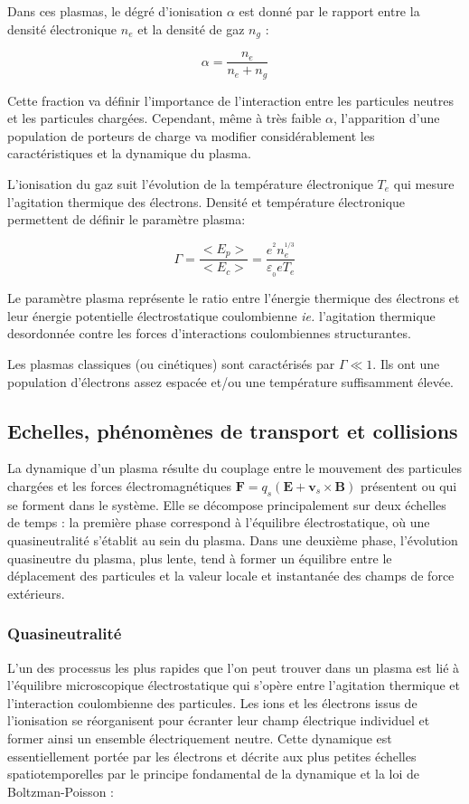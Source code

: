 Dans ces plasmas, le dégré d'ionisation $\alpha$ est donné par le rapport
entre la densité électronique $n_e$ et la densité de gaz $n_g$ :

\begin{equation}
\alpha=\frac{n_e}{n_e+n_g}
\end{equation}

Cette fraction va définir l'importance de l'interaction entre les particules
neutres et les particules chargées. Cependant, même à très faible $\alpha$,
l'apparition d'une population de porteurs de charge va modifier considérablement 
les caractéristiques et la dynamique du plasma.

L'ionisation du gaz suit l'évolution de la température électronique $T_e$ qui
mesure l'agitation thermique des électrons. Densité et température
électronique permettent de définir le paramètre plasma:

\begin{equation}
\label{1-paramPlasma}
\Gamma=\frac{<E_p>}{<E_c>}=\frac{e^{^2}n_e^{^{1/3}}}{\varepsilon_{_0}
eT_e}
\end{equation}

Le paramètre plasma représente le ratio entre l'énergie thermique des
électrons et leur énergie potentielle électrostatique coulombienne \emph{ie.}
l'agitation thermique desordonnée contre les forces d'interactions
coulombiennes structurantes.

Les plasmas classiques (ou cinétiques) sont caractérisés par
$\Gamma\ll 1$. Ils ont une population d'électrons assez espacée et/ou une
température suffisamment élevée.

\subsection{Echelles, phénomènes de transport et collisions}
La dynamique d'un plasma résulte du couplage entre le mouvement des
particules chargées et les forces électromagnétiques $\mathbf
F=q_s(\mathbf E+ \mathbf v_s\times\mathbf B)$
présentent ou qui se forment dans le système.
Elle se décompose principalement sur deux échelles de temps : la première
phase correspond à l'équilibre électrostatique, où une
quasineutralité s'établit au sein du plasma. Dans une deuxième phase, l'évolution quasineutre du
plasma, plus lente, tend à former un équilibre entre le déplacement des particules et la valeur locale
et instantanée des champs de force extérieurs.

\subsubsection{Quasineutralité}
L'un des processus les plus rapides que l'on peut trouver dans un plasma est lié à
l'équilibre microscopique électrostatique qui s'opère
entre l'agitation thermique et l'interaction coulombienne des particules. Les
ions et les électrons issus de l'ionisation se réorganisent pour écranter
leur champ électrique individuel et former ainsi un ensemble électriquement neutre.
Cette dynamique est essentiellement portée par les électrons et décrite aux plus petites
échelles spatiotemporelles par le principe fondamental de la dynamique et la loi de Boltzman-Poisson :

